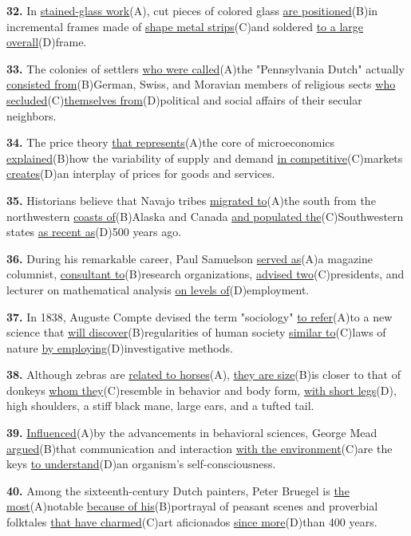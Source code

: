 \documentclass[12pt]{article}
\begin{document}
\noindent\textbf{32.} In \uline{stained-glass work}(A), cut pieces of colored glass \uline{are positioned}(B)in incremental frames made of \uline{shape metal strips}(C)and soldered \uline{to a large overall}(D)frame.
\par
\vspace{\questionblockgap}
\noindent\textbf{33.} The colonies of settlers \uline{who were called}(A)the "Pennsylvania Dutch" actually \uline{consisted from}(B)German, Swiss, and Moravian members of religious sects \uline{who secluded}(C)\uline{themselves from}(D)political and social affairs of their secular neighbors.
\par
\vspace{\questionblockgap}
\noindent\textbf{34.} The price theory \uline{that represents}(A)the core of microeconomics \uline{explained}(B)how the variability of supply and demand \uline{in competitive}(C)markets \uline{creates}(D)an interplay of prices for goods and services.
\par
\vspace{\questionblockgap}
\noindent\textbf{35.} Historians believe that Navajo tribes \uline{migrated to}(A)the south from the northwestern \uline{coasts of}(B)Alaska and Canada \uline{and populated the}(C)Southwestern states \uline{as recent as}(D)500 years ago.
\par
\vspace{\questionblockgap}
\noindent\textbf{36.} During his remarkable career, Paul Samuelson \uline{served as}(A)a magazine columnist, \uline{consultant to}(B)research organizations, \uline{advised two}(C)presidents, and lecturer on mathematical analysis \uline{on levels of}(D)employment.
\par
\vspace{\questionblockgap}
\noindent\textbf{37.} In 1838, Auguste Compte devised the term "sociology" \uline{to refer}(A)to a new science that \uline{will discover}(B)regularities of human society \uline{similar to}(C)laws of nature \uline{by employing}(D)investigative methods.
\par
\vspace{\questionblockgap}
\noindent\textbf{38.} Although zebras are \uline{related to horses}(A), \uline{they are size}(B)is closer to that of donkeys \uline{whom they}(C)resemble in behavior and body form, \uline{with short legs}(D), high shoulders, a stiff black mane, large ears, and a tufted tail.
\par
\vspace{\questionblockgap}
\noindent\textbf{39.} \uline{Influenced}(A)by the advancements in behavioral sciences, George Mead \uline{argued}(B)that communication and interaction \uline{with the environment}(C)are the keys \uline{to understand}(D)an organism's self-consciousness.
\par
\vspace{\questionblockgap}
\noindent\textbf{40.} Among the sixteenth-century Dutch painters, Peter Bruegel is \uline{the most}(A)notable \uline{because of his}(B)portrayal of peasant scenes and proverbial folktales \uline{that have charmed}(C)art aficionados \uline{since more}(D)than 400 years.
\par
\vspace{\questionblockgap}
\end{document}
